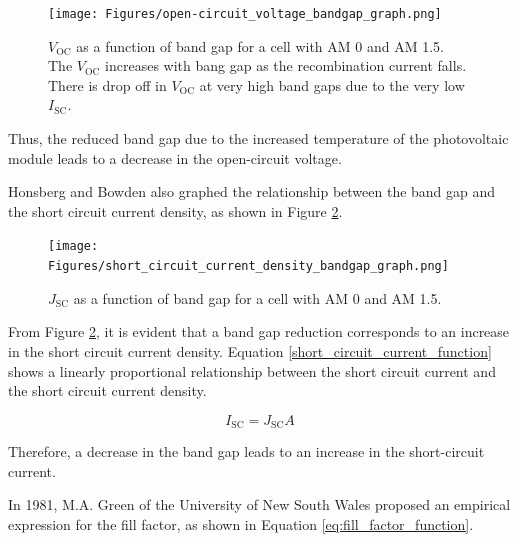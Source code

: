 \begin{figure}[ht]
    \centering
    \texttt{[image: Figures/open-circuit\_voltage\_bandgap\_graph.png]}
    \caption{$V_\text{OC}$ as a function of band gap for a cell with AM 0 and AM 1.5. The $V_\text{OC}$ increases with bang gap as the recombination current falls. There is drop off in $V_\text{OC}$ at very high band gaps due to the very low $I_\text{SC}$. \cite{HonsbergOpen-CircuitVoltage}}
    \label{fig:open-circuit_voltage_bandgap_graph}
\end{figure}
\FloatBarrier

Thus, the reduced band gap due to the increased temperature of the photovoltaic module leads to a decrease in the open-circuit voltage. \cite{HonsbergOpen-CircuitVoltage}\vspace{0.5em}

\pagebreak
Honsberg and Bowden also graphed the relationship between the band gap and the short circuit current density, as shown in Figure \ref{fig:short_circuit_current_density_bandgap_graph}.

\begin{figure}[ht]
    \centering
    \texttt{[image: Figures/short\_circuit\_current\_density\_bandgap\_graph.png]}
    \caption{$J_\text{SC}$ as a function of band gap for a cell with AM 0 and AM 1.5. \cite{HonsbergShort-CircuitCurrent}}
    \label{fig:short_circuit_current_density_bandgap_graph}
\end{figure}
\FloatBarrier

From Figure \ref{fig:short_circuit_current_density_bandgap_graph}, it is evident that a band gap reduction corresponds to an increase in the short circuit current density. Equation \ref{short_circuit_current_function} shows a linearly proportional relationship between the short circuit current and the short circuit current density.

\begin{equation}
    I_\text{SC} = J_\text{SC}A
    \label{short_circuit_current_function}
\end{equation}

Therefore, a decrease in the band gap leads to an increase in the short-circuit current. \cite{HonsbergShort-CircuitCurrent}\vspace{0.5em}

In 1981, M.A. Green of the University of New South Wales proposed an empirical expression for the fill factor, as shown in Equation \ref{eq:fill_factor_function}.

